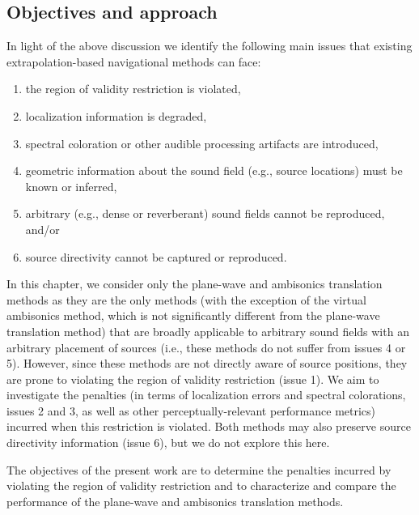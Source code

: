 \subsection{Objectives and approach}
In light of the above discussion we identify the following main issues that existing extrapolation-based navigational methods can face:
\begin{enumerate}
\item the region of validity restriction is violated,
\item localization information is degraded,
\item spectral coloration or other audible processing artifacts are introduced,
\item geometric information about the sound field (e.g., source locations) must be known or inferred,
\item arbitrary (e.g., dense or reverberant) sound fields cannot be reproduced, and/or
\item source directivity cannot be captured or reproduced.
\end{enumerate}
In this chapter, we consider only the plane-wave and ambisonics translation methods as they are the only methods (with the exception of the virtual ambisonics method, which is not significantly different from the plane-wave translation method) that are broadly applicable to arbitrary sound fields with an arbitrary placement of sources (i.e., these methods do not suffer from issues 4 or 5).
However, since these methods are not directly aware of source positions, they are prone to violating the region of validity restriction (issue 1).
We aim to investigate the penalties (in terms of localization errors and spectral colorations, issues 2 and 3, as well as other perceptually-relevant performance metrics) incurred when this restriction is violated.
Both methods may also preserve source directivity information (issue 6), but we do not explore this here.

The objectives of the present work are to determine the penalties incurred by violating the region of validity restriction and to characterize and compare the performance of the plane-wave and ambisonics translation methods.


